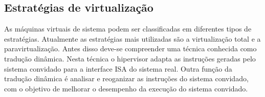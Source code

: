 


\subsection{Estratégias de virtualização}
\label{section:virtestrat}

As máquinas virtuais de sistema podem ser classificadas em diferentes tipos de estratégias. Atualmente as estratégias mais utilizadas
são a virtualização total e a paravirtualização. Antes disso deve-se compreender uma técnica conhecida como tradução dinâmica. Nesta 
técnica o hipervisor adapta as instruções geradas pelo sistema convidado para a interface \ac{ISA} do sistema real. Outra função da 
tradução dinâmica é analisar e reoganizar as instruções do sistema convidado, com o objetivo de melhorar o desempenho da execução do 
sistema convidado.


